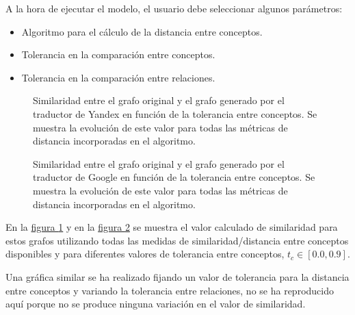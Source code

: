 \documentclass[a4paper,12pt,spanish]{book}
\begin{document}
A la hora de ejecutar el modelo, el usuario debe seleccionar algunos parámetros:
\begin{itemize}
\item {} 
Algoritmo para el cálculo de la distancia entre conceptos.

\item {} 
Tolerancia en la comparación entre conceptos.

\item {} 
Tolerancia en la comparación entre relaciones.

\end{itemize}
\begin{figure}[htbp]
\centering
\capstart

\caption[Similaridad entre el grafo original y el grafo generado por el traductor de Yandex.]{Similaridad entre el grafo original y el grafo generado por el traductor de Yandex en función de la tolerancia entre conceptos. Se muestra la evolución de este valor para todas las métricas de distancia incorporadas en el algoritmo.}\label{5.pruebas/index:sample03-measures-yandex-synset}\end{figure}
\begin{figure}[htbp]
\centering
\capstart

\caption[Similaridad entre el grafo original y el grafo generado por el traductor de Google.]{Similaridad entre el grafo original y el grafo generado por el traductor de Google en función de la tolerancia entre conceptos. Se muestra la evolución de este valor para todas las métricas de distancia incorporadas en el algoritmo.}\label{5.pruebas/index:sample03-measures-google-synset}\end{figure}

En la \hyperref[5.pruebas/index:sample03-measures-yandex-synset]{figura  \ref*{5.pruebas/index:sample03-measures-yandex-synset}} y en la
\hyperref[5.pruebas/index:sample03-measures-google-synset]{figura  \ref*{5.pruebas/index:sample03-measures-google-synset}}
se muestra el valor calculado de similaridad para estos grafos utilizando todas
las medidas de similaridad/distancia entre conceptos disponibles y para
diferentes valores de tolerancia entre conceptos, \(t_c \in [0.0, 0.9]\).

Una gráfica similar se ha realizado fijando un valor de tolerancia para la
distancia entre conceptos y variando la tolerancia entre relaciones, no se ha
reproducido aquí porque no se produce ninguna variación en el valor de
similaridad.
\end{document}

